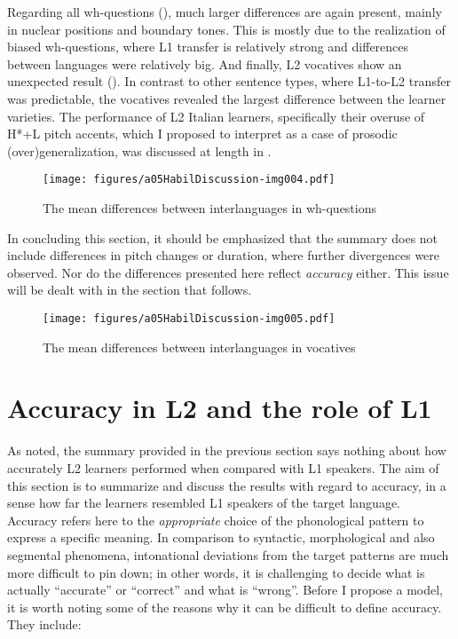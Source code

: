 Regarding all wh-questions (), much larger differences are again present, mainly in nuclear positions and boundary tones. This is mostly due to the realization of biased wh-questions, where L1 transfer is relatively strong and differences between languages were relatively big. And finally, L2 vocatives show an unexpected result (). In contrast to other sentence types, where L1-to-L2 transfer was predictable, the vocatives revealed the largest difference between the learner varieties. The performance of L2 Italian learners, specifically their overuse of H*+L pitch accents, which I proposed to interpret as a case of prosodic (over)generalization, was discussed at length in .

\begin{figure}
\texttt{[image: figures/a05HabilDiscussion-img004.pdf]}
\caption{The mean differences between interlanguages in wh-questions\label{fig:5.1d}}
\end{figure}

In concluding this section, it should be emphasized that the summary does not include differences in pitch changes or duration, where further divergences were observed. Nor do the differences presented here reflect \textit{accuracy} either. This issue will be dealt with in the section that follows.

\begin{figure}
\texttt{[image: figures/a05HabilDiscussion-img005.pdf]}
\caption{The mean differences between interlanguages in vocatives\label{fig:5.1e}}
\end{figure}

\section{Accuracy in L2 and the role of L1}\label{sec:5.2} %

As noted, the summary provided in the previous section says nothing about how accurately L2 learners performed when compared with L1 speakers. The aim of this section is to summarize and discuss the results with regard to accuracy, in a sense how far the learners resembled L1 speakers of the target language. Accuracy refers here to the \textit{appropriate} choice of the phonological pattern to express a specific meaning. In comparison to syntactic, morphological and also segmental phenomena, intonational deviations from the target patterns are much more difficult to pin down; in other words, it is challenging to decide what is actually “accurate” or “correct” and what is “wrong”. Before I propose a model, it is worth noting some of the reasons why it can be difficult to define accuracy. They include:

